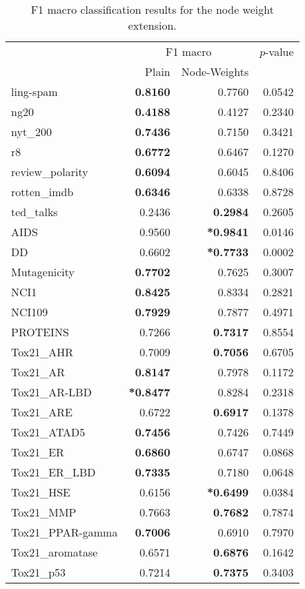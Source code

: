 \begin{table}[htb!]
	\centering
	\begin{tabular}{lrrr}
		\toprule
		{} & \multicolumn{2}{c}{F1 macro} & {$p$-value} \\
		{} &  Plain &  Node-Weights  &  \\
		\midrule
		ling-spam       & \textbf{0.8160} & 0.7760 & 0.0542 \\
		ng20            & \textbf{0.4188} & 0.4127 & 0.2340 \\
		nyt\_200         &\textbf{ 0.7436} & 0.7150 & 0.3421 \\
		r8              & \textbf{0.6772} & 0.6467 & 0.1270 \\
		review\_polarity & \textbf{0.6094} & 0.6045 & 0.8406 \\
		rotten\_imdb     & \textbf{0.6346} & 0.6338 & 0.8728 \\
		ted\_talks       & 0.2436 & \textbf{0.2984} & 0.2605 \\
		\midrule
		AIDS             & 0.9560 & \textbf{*0.9841} & 0.0146 \\
		DD               & 0.6602 & \textbf{*0.7733} & 0.0002 \\
		Mutagenicity     & \textbf{0.7702} & 0.7625 & 0.3007 \\
		NCI1             & \textbf{0.8425} & 0.8334 & 0.2821 \\
		NCI109           & \textbf{0.7929} & 0.7877 & 0.4971 \\
		PROTEINS         & 0.7266 & \textbf{0.7317} & 0.8554 \\
		Tox21\_AHR        & 0.7009 & \textbf{0.7056} & 0.6705 \\
		Tox21\_AR         & \textbf{0.8147} & 0.7978 & 0.1172 \\
		Tox21\_AR-LBD     & \textbf{*0.8477} & 0.8284 & 0.2318 \\
		Tox21\_ARE        & 0.6722 & \textbf{0.6917} & 0.1378 \\
		Tox21\_ATAD5      & \textbf{0.7456} & 0.7426 & 0.7449 \\
		Tox21\_ER         & \textbf{0.6860} & 0.6747 & 0.0868 \\
		Tox21\_ER\_LBD     & \textbf{0.7335} & 0.7180 & 0.0648 \\
		Tox21\_HSE        & 0.6156 & \textbf{*0.6499} & 0.0384 \\
		Tox21\_MMP        & 0.7663 & \textbf{0.7682} & 0.7874 \\
		Tox21\_PPAR-gamma & \textbf{0.7006} & 0.6910 & 0.7970 \\
		Tox21\_aromatase  & 0.6571 & \textbf{0.6876} & 0.1642 \\
		Tox21\_p53        & 0.7214 & \textbf{0.7375} & 0.3403 \\
		\bottomrule
	\end{tabular}
	\caption[Results: Classification using node weight WL extension]{F1 macro classification results for  the node weight extension.}\label{table:wl_node_weight_extension}
\end{table}

